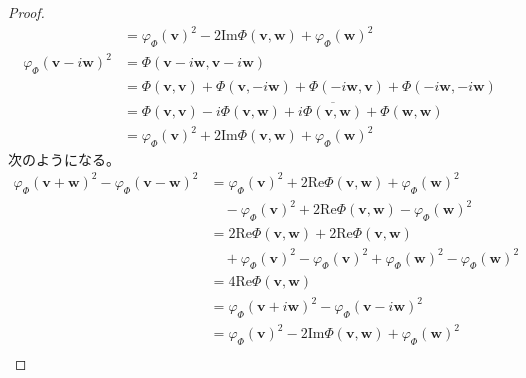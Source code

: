 \documentclass[dvipdfmx]{jsarticle}
\begin{document}
\begin{proof}
\begin{align*}
&= {\varphi_{\varPhi}\left( \mathbf{v} \right)}^{2} - 2\mathrm{Im}{\varPhi\left( \mathbf{v},\mathbf{w} \right)} + {\varphi_{\varPhi}\left( \mathbf{w} \right)}^{2}\\
{\varphi_{\varPhi}\left( \mathbf{v} - i\mathbf{w} \right)}^{2} &= \varPhi\left( \mathbf{v} - i\mathbf{w},\mathbf{v} - i\mathbf{w} \right)\\
&= \varPhi\left( \mathbf{v},\mathbf{v} \right) + \varPhi\left( \mathbf{v}, - i\mathbf{w} \right) + \varPhi\left( \mathbf{-}i\mathbf{w},\mathbf{v} \right) + \varPhi\left( \mathbf{-}i\mathbf{w}, - i\mathbf{w} \right)\\
&= \varPhi\left( \mathbf{v},\mathbf{v} \right) - i\varPhi\left( \mathbf{v},\mathbf{w} \right) + i\overline{\varPhi\left( \mathbf{v},\mathbf{w} \right)} + \varPhi\left( \mathbf{w},\mathbf{w} \right)\\
&= {\varphi_{\varPhi}\left( \mathbf{v} \right)}^{2} + 2\mathrm{Im}{\varPhi\left( \mathbf{v},\mathbf{w} \right)} + {\varphi_{\varPhi}\left( \mathbf{w} \right)}^{2}
\end{align*}
次のようになる。
\begin{align*}
{\varphi_{\varPhi}\left( \mathbf{v} + \mathbf{w} \right)}^{2} - {\varphi_{\varPhi}\left( \mathbf{v} - \mathbf{w} \right)}^{2} &= {\varphi_{\varPhi}\left( \mathbf{v} \right)}^{2} + 2\mathrm{Re}{\varPhi\left( \mathbf{v},\mathbf{w} \right)} + {\varphi_{\varPhi}\left( \mathbf{w} \right)}^{2} \\
&\quad - {\varphi_{\varPhi}\left( \mathbf{v} \right)}^{2} + 2\mathrm{Re}{\varPhi\left( \mathbf{v},\mathbf{w} \right)} - {\varphi_{\varPhi}\left( \mathbf{w} \right)}^{2}\\
&= 2\mathrm{Re}{\varPhi\left( \mathbf{v},\mathbf{w} \right)} + 2\mathrm{Re}{\varPhi\left( \mathbf{v},\mathbf{w} \right)} \\
&\quad + {\varphi_{\varPhi}\left( \mathbf{v} \right)}^{2} - {\varphi_{\varPhi}\left( \mathbf{v} \right)}^{2} + {\varphi_{\varPhi}\left( \mathbf{w} \right)}^{2} - {\varphi_{\varPhi}\left( \mathbf{w} \right)}^{2}\\
&= 4\mathrm{Re}{\varPhi\left( \mathbf{v},\mathbf{w} \right)}\\
&= {\varphi_{\varPhi}\left( \mathbf{v} + i\mathbf{w} \right)}^{2} - {\varphi_{\varPhi}\left( \mathbf{v} - i\mathbf{w} \right)}^{2}\\
&= {\varphi_{\varPhi}\left( \mathbf{v} \right)}^{2} - 2\mathrm{Im}{\varPhi\left( \mathbf{v},\mathbf{w} \right)} + {\varphi_{\varPhi}\left( \mathbf{w} \right)}^{2} \\

\end{align*}
\end{proof}
\end{document}
